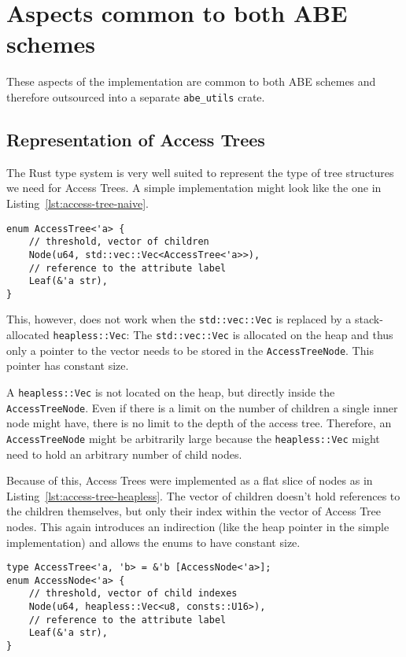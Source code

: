 \section{Aspects common to both ABE schemes}

These aspects of the implementation are common to both ABE schemes and therefore outsourced into a separate \verb+abe_utils+ crate.

\subsection{Representation of Access Trees}
The Rust type system is very well suited to represent the type of tree structures we need for Access Trees.
A simple implementation might look like the one in Listing~\ref{lst:access-tree-naive}. 

\begin{lstlisting}[caption={Simple Implementation of Access Trees (using the standard library)},label={lst:access-tree-naive}]
enum AccessTree<'a> {
    // threshold, vector of children
    Node(u64, std::vec::Vec<AccessTree<'a>>),
    // reference to the attribute label
    Leaf(&'a str),
}
\end{lstlisting}

This, however, does not work when the \texttt{std::vec::Vec} is replaced by a stack-allocated \texttt{heapless::Vec}:
The \texttt{std::vec::Vec} is allocated on the heap and thus only a pointer to the vector needs to be stored in the \texttt{AccessTreeNode}.
This pointer has constant size.

A \texttt{heapless::Vec} is not located on the heap, but directly inside the \texttt{AccessTreeNode}.
Even if there is a limit on the number of children a single inner node might have, there is no limit to the depth of the access tree.
Therefore, an \texttt{AccessTreeNode} might be arbitrarily large because the \texttt{heapless::Vec} might need to hold an arbitrary number of child nodes.

Because of this, Access Trees were implemented as a flat slice of nodes as in Listing~\ref{lst:access-tree-heapless}. 
The vector of children doesn't hold references to the children themselves, but only their index within the vector of Access Tree nodes.
This again introduces an indirection (like the heap pointer in the simple implementation) and allows the enums to have constant size.

\begin{lstlisting}[caption={Refined implementation of Access Trees (works without standard library)},label={lst:access-tree-heapless}]
type AccessTree<'a, 'b> = &'b [AccessNode<'a>];
enum AccessNode<'a> {
    // threshold, vector of child indexes
    Node(u64, heapless::Vec<u8, consts::U16>),
    // reference to the attribute label
    Leaf(&'a str),
}
\end{lstlisting}

